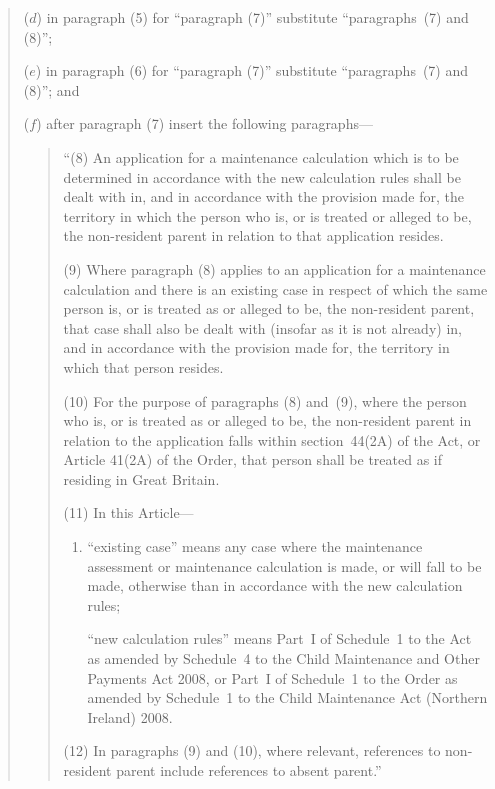 \documentclass[12pt,a4paper]{article}
\begin{document}
\begin{quotation}
\begin{enumerate}
\begin{sloppypar}
($d$) in paragraph (5) for ``paragraph (7)'' substitute ``paragraphs~(7) and (8)'';
\end{sloppypar}

\begin{sloppypar}
($e$) in paragraph (6) for ``paragraph (7)'' substitute ``paragraphs~(7) and (8)''; and
\end{sloppypar}

($f$) after paragraph (7) insert the following paragraphs---
\begin{quotation}
``(8) An application for a maintenance calculation which is to be determined in accordance with the new calculation rules shall be dealt with in, and in accordance with the provision made for, the territory in which the person who is, or is treated or alleged to be, the non-resident parent in relation to that application resides.

(9) Where paragraph (8) applies to an application for a maintenance calculation and there is an existing case in respect of which the same person is, or is treated as or alleged to be, the non-resident parent, that case shall also be dealt with (insofar as it is not already) in, and in accordance with the provision made for, the territory in which that person resides.

(10) For the purpose of paragraphs (8) and~(9), where the person who is, or is treated as or alleged to be, the non-resident parent in relation to the application falls within section~44(2A) of the Act, or Article 41(2A) of the Order, that person shall be treated as if residing in Great Britain.

(11) In this Article---
\begin{enumerate}\item[]
``existing case'' means any case where the maintenance assessment or maintenance calculation is made, or will fall to be made, otherwise than in accordance with the new calculation rules;

``new calculation rules'' means Part~I of Schedule~1 to the Act as amended by Schedule~4 to the Child Maintenance and Other Payments Act 2008, or Part~I of Schedule~1 to the Order as amended by Schedule~1 to the Child Maintenance Act (Northern Ireland) 2008.
\end{enumerate}

(12) In paragraphs (9) and (10), where relevant, references to non-resident parent include references to absent parent.''
\end{quotation}
\end{enumerate}
\end{quotation}
\end{document}
